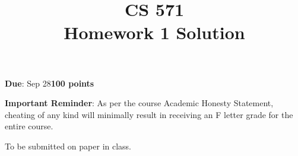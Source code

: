 \documentclass[12pt]{article}
\title{CS 571\\Homework 1 Solution}
\date{}
\begin{document}
\maketitle

\begin{flushleft}
\textbf{Due}: Sep 28\hfill\textbf{100 points}\\

\vspace{0.5cm}

\textbf{Important Reminder}: As per the course Academic Honesty
Statement, cheating of any kind will minimally result in receiving an
F letter grade for the entire course.


\end{flushleft}

To be submitted on paper in class.
\end{document}
